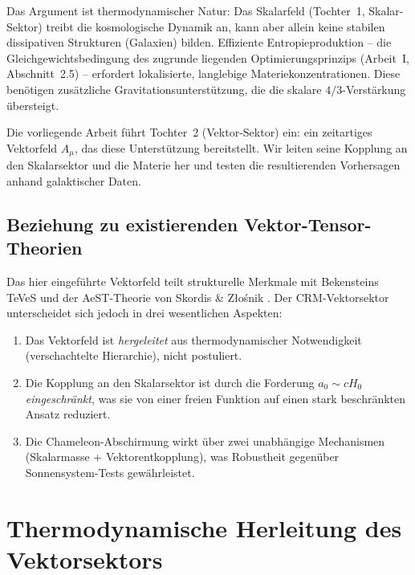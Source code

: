 \documentclass[aps,prd,twocolumn,superscriptaddress,nofootinbib]{revtex4-2}
\begin{document}
Das Argument ist thermodynamischer Natur: Das Skalarfeld (Tochter~1, Skalar-Sektor) treibt die kosmologische Dynamik an, kann aber allein keine stabilen dissipativen Strukturen (Galaxien) bilden. Effiziente Entropieproduktion -- die Gleichgewichtsbedingung des zugrunde liegenden Optimierungsprinzips (Arbeit~I, Abschnitt~2.5) -- erfordert lokalisierte, langlebige Materiekonzentrationen. Diese ben\"otigen zus\"atzliche Gravitationsunterst\"utzung, die die skalare $4/3$-Verst\"arkung \"ubersteigt.

Die vorliegende Arbeit f\"uhrt Tochter~2 (Vektor-Sektor) ein: ein zeitartiges Vektorfeld $A_\mu$, das diese Unterst\"utzung bereitstellt. Wir leiten seine Kopplung an den Skalarsektor und die Materie her und testen die resultierenden Vorhersagen anhand galaktischer Daten.

\subsection{Beziehung zu existierenden Vektor-Tensor-Theorien}

Das hier eingef\"uhrte Vektorfeld teilt strukturelle Merkmale mit Bekensteins TeVeS \cite{Bekenstein2004} und der AeST-Theorie von Skordis \& Z{\l}o\'snik \cite{Skordis2021}. Der CRM-Vektorsektor unterscheidet sich jedoch in drei wesentlichen Aspekten:
\begin{enumerate}
\item Das Vektorfeld ist \textit{hergeleitet} aus thermodynamischer Notwendigkeit (verschachtelte Hierarchie), nicht postuliert.
\item Die Kopplung an den Skalarsektor ist durch die Forderung $a_0 \sim cH_0$ \textit{eingeschr\"ankt}, was sie von einer freien Funktion auf einen stark beschr\"ankten Ansatz reduziert.
\item Die Chameleon-Abschirmung wirkt \"uber zwei unabh\"angige Mechanismen (Skalarmasse + Vektorentkopplung), was Robustheit gegen\"uber Sonnensystem-Tests gew\"ahrleistet.
\end{enumerate}


\section{Thermodynamische Herleitung des Vektorsektors}
\label{sec:derivation}
\end{document}
